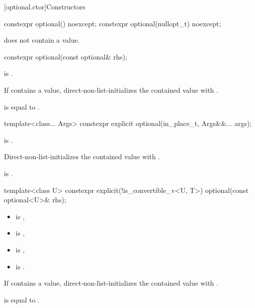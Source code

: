 [optional.ctor]{Constructors}

%
\begin{itemdecl}
constexpr optional() noexcept;
constexpr optional(nullopt_t) noexcept;
\end{itemdecl}

\begin{itemdescr}
\pnum
\ensures
{} does not contain a value.
\end{itemdescr}

%
\begin{itemdecl}
constexpr optional(const optional& rhs);
\end{itemdecl}

\begin{itemdescr}
\pnum
\constraints
{} is .

\pnum
\effects
If  contains a value, direct-non-list-initializes the contained value with .

\pnum
\ensures
{} is equal to .
\end{itemdescr}

%
\begin{itemdecl}
template<class... Args> constexpr explicit optional(in_place_t, Args&&... args);
\end{itemdecl}

\begin{itemdescr}
\pnum
\constraints
{} is .

\pnum
\effects
Direct-non-list-initializes the contained value with .

\pnum
\ensures
{} is .
\end{itemdescr}

%
\begin{itemdecl}
template<class U>
constexpr explicit(!is_convertible_v<U, T>) optional(const optional<U>& rhs);
\end{itemdecl}

\begin{itemdescr}
\pnum
\constraints
\begin{itemize}
\item {} is ,
\item {} is ,
\item {} is ,
\item {} is .
\end{itemize}

\pnum
\effects
If  contains a value, direct-non-list-initializes the contained value with .

\pnum
\ensures
{} is equal to .
\end{itemdescr}
